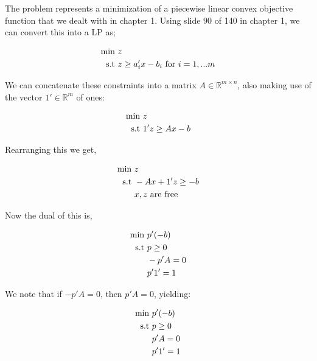 


The problem represents a minimization of a piecewise linear convex objective function that we dealt with in chapter 1. Using slide 90 of 140 in chapter 1, we can convert this into a LP as;

\begin{align}
    \text{min } &z \notag\\
    \text{s.t }  &z \ge a_i'x - b_i \text{ for } i=1,...m\notag
\end{align}

We can concatenate these constraints into a matrix $A\in\mathbb{R}^{m\times n}$, also making use of the vector $1'\in\mathbb{R}^m$ of ones:

\begin{align}
    \text{min } &z \notag\\
    \text{s.t }  &1'z \ge Ax - b \notag
\end{align}

Rearranging this we get,

\begin{align}
    \text{min } &z \notag\\
    \text{s.t }  &-Ax + 1'z \ge -b  \notag\\
                &x, z \text{ are free }\notag
\end{align}

Now the dual of this is, 

\begin{align}
    \text{min } &p'(-b) \notag\\
    \text{s.t }  &p \ge 0 \notag\\
                &-p'A = 0 \notag\\
                &p'1' = 1 \notag
\end{align}

We note that if $-p'A=0$, then $p'A=0$, yielding:

\begin{align}
    \text{min } &p'(-b) \notag\\
    \text{s.t }  &p \ge 0 \notag\\
                &p'A = 0 \notag\\
                &p'1' = 1 \notag
\end{align}

